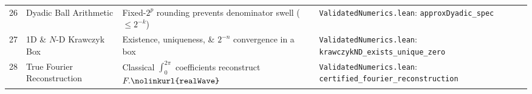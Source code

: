 \documentclass[11pt,a4paper]{article}
\newcommand{\lean}[1]{\texttt{\nolinkurl{#1}}}
\begin{document}
\begin{center}
\begin{tabular}{@{}p{0.5cm}>{\raggedright\arraybackslash}p{3.9cm}>{\raggedright\arraybackslash}p{4.8cm}>{\raggedright\arraybackslash}p{5.5cm}@{}}
26 & Dyadic Ball Arithmetic & Fixed-$2^p$ rounding prevents denominator swell ($\le 2^{-k}$) & \lean{ValidatedNumerics.lean}: \lean{approxDyadic_spec} \\
27 & 1D \& $N$-D Krawczyk Box & Existence, uniqueness, \& $2^{-n}$ convergence in a box & \lean{ValidatedNumerics.lean}: \lean{krawczykND_exists_unique_zero} \\
28 & True Fourier Reconstruction & Classical $\int_0^{2\pi}$ coefficients reconstruct $F.\lean{realWave}$ & \lean{ValidatedNumerics.lean}: \lean{certified_fourier_reconstruction} \\
\bottomrule
\end{tabular}
\end{center}
\end{document}
